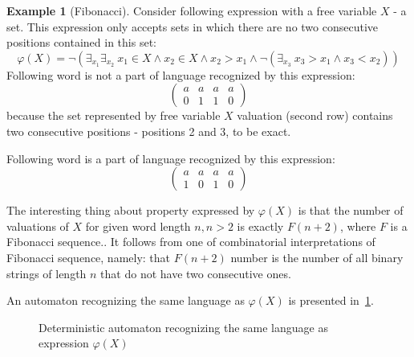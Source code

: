 \documentclass[12pt]{article}
\newcommand{\icol}[1]{%
  \left(\begin{smallmatrix}#1\end{smallmatrix}\right)%
}
\theoremstyle{definition}
\newtheorem{example}{Example}[section]
\begin{document}
\begin{example}[Fibonacci]
    \label{ExFib}
    Consider following expression with a free variable $X$ - a set. This expression only accepts sets in which there are no two consecutive positions contained in this set:
    $$\varphi(X) = \neg(\exists_{x_1}\exists_{x_2} \ x_1 \in X \land x_2 \in X \land x_2 > x_1 \land \neg(\exists_{x_3} \ x_3 > x_1 \land x_3 < x_2 ))$$
    Following word is not a part of language recognized by this expression:
    $$\begin{pmatrix}
        a & a & a & a\\
        0 & 1 & 1 & 0
    \end{pmatrix}$$
    because the set represented by free variable $X$ valuation (second row) contains two consecutive positions - positions 2 and 3, to be exact.

    Following word is a part of language recognized by this expression:
    $$\begin{pmatrix}
        a & a & a & a\\
        1 & 0 & 1 & 0
    \end{pmatrix}$$

    The interesting thing about property expressed by $\varphi(X)$ is that the number of valuations of $X$ for given word length $n, n > 2$ is exactly $F(n + 2)$, where $F$ is a Fibonacci sequence.. It follows from one of combinatorial interpretations of Fibonacci sequence, namely: that $F(n+2)$ number is the number of all binary strings of length $n$ that do not have two consecutive ones.

    An automaton recognizing the same language as $\varphi(X)$ is presented in~\cref{fig:my_label}.

    \begin{figure}[ht]
        \centering
        \caption{Deterministic automaton recognizing the same language as expression $\varphi(X)$}
        \label{fig:my_label}
    \end{figure}
\end{example} \
\end{document}
